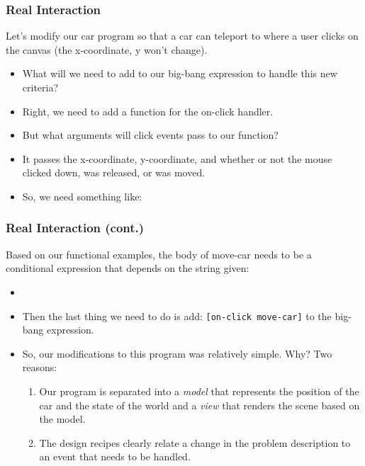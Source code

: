 \documentclass{beamer}
\begin{document}

\begin{frame}
  \frametitle{Real Interaction}
  Let's modify our car program so that a car can teleport to where a user clicks
  on the canvas (the x-coordinate, y won't change).
  \begin{itemize}
  \item<2-> What will we need to add to our big-bang expression to handle this
    new criteria?
  \item<3-> Right, we need to add a function for the on-click handler.
  \item<4-> But what arguments will click events pass to our function?
  \item<5-> It passes the x-coordinate, y-coordinate, and whether or not the
    mouse clicked down, was released, or was moved.
  \item<6-> So, we need something like:
    \moveCar
  \end{itemize}
\end{frame}


\begin{frame}
  \frametitle{Real Interaction (cont.)}
  Based on our functional examples, the body of move-car needs to be a
  conditional expression that depends on the string given:
  \begin{itemize}
  \item<2-> \moveCar
  \item<3-> Then the last thing we need to do is add:
    \texttt{[on-click move-car]} to the big-bang expression.
  \item<4-> So, our modifications to this program was relatively simple. Why?
    Two reasons:
    \begin{enumerate}
    \item<5-> Our program is separated into a \emph{model} that represents
      the position of the car and the state of the world and a \emph{view}
      that renders the scene based on the model.
    \item<6-> The design recipes clearly relate a change in the problem description
      to an event that needs to be handled.
    \end{enumerate}
  \end{itemize}
\end{frame}
\end{document}
